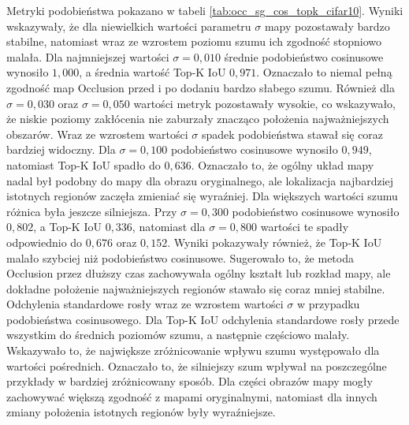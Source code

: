 Metryki podobieństwa pokazano w tabeli \ref{tab:occ_sg_cos_topk_cifar10}. Wyniki wskazywały, że dla niewielkich wartości parametru $\sigma$ mapy pozostawały bardzo stabilne, natomiast wraz ze wzrostem poziomu szumu ich zgodność stopniowo malała.
Dla najmniejszej wartości $\sigma = 0{,}010$ średnie podobieństwo cosinusowe wynosiło $1{,}000$, a średnia wartość Top-K IoU $0{,}971$. Oznaczało to niemal pełną zgodność map Occlusion przed i po dodaniu bardzo słabego szumu. Również dla $\sigma = 0{,}030$ oraz $\sigma = 0{,}050$ wartości metryk pozostawały wysokie, co wskazywało, że niskie poziomy zakłócenia nie zaburzały znacząco położenia najważniejszych obszarów.
Wraz ze wzrostem wartości $\sigma$ spadek podobieństwa stawał się coraz bardziej widoczny. Dla $\sigma = 0{,}100$ podobieństwo cosinusowe wynosiło $0{,}949$, natomiast Top-K IoU spadło do $0{,}636$. Oznaczało to, że ogólny układ mapy nadal był podobny do mapy dla obrazu oryginalnego, ale lokalizacja najbardziej istotnych regionów zaczęła zmieniać się wyraźniej. Dla większych wartości szumu różnica była jeszcze silniejsza. Przy $\sigma = 0{,}300$ podobieństwo cosinusowe wynosiło $0{,}802$, a Top-K IoU $0{,}336$, natomiast dla $\sigma = 0{,}800$ wartości te spadły odpowiednio do $0{,}676$ oraz $0{,}152$.
Wyniki pokazywały również, że Top-K IoU malało szybciej niż podobieństwo cosinusowe. Sugerowało to, że metoda Occlusion przez dłuższy czas zachowywała ogólny kształt lub rozkład mapy, ale dokładne położenie najważniejszych regionów stawało się coraz mniej stabilne. Odchylenia standardowe rosły wraz ze wzrostem wartości $\sigma$ w przypadku podobieństwa cosinusowego. Dla Top-K IoU odchylenia standardowe rosły przede wszystkim do średnich poziomów szumu, a następnie częściowo malały. Wskazywało to, że największe zróżnicowanie wpływu szumu występowało dla wartości pośrednich. Oznaczało to, że silniejszy szum wpływał na poszczególne przykłady w bardziej zróżnicowany sposób. Dla części obrazów mapy mogły zachowywać większą zgodność z mapami oryginalnymi, natomiast dla innych zmiany położenia istotnych regionów były wyraźniejsze.


